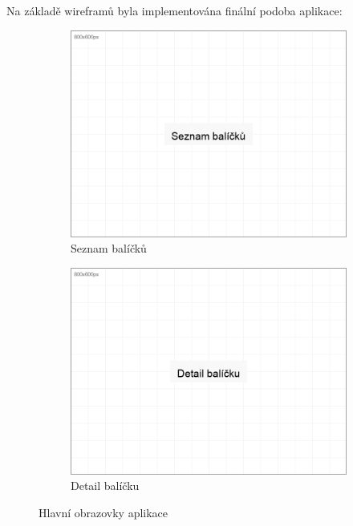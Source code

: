 \documentclass[12pt, a4paper, twoside, openright]{report}
\begin{document}
	Na základě wireframů byla implementována finální podoba aplikace:

	\begin{figure}[h]
		\centering
		\begin{subfigure}[b]{0.48\textwidth}
			\includegraphics[width=\linewidth]{image/screen-deck-list.png}
			\caption{Seznam balíčků}
			\label{fig:screen-decks}
		\end{subfigure}
		\hfill
		\begin{subfigure}[b]{0.48\textwidth}
			\includegraphics[width=\linewidth]{image/screen-deck-detail.png}
			\caption{Detail balíčku}
			\label{fig:screen-detail}
		\end{subfigure}
		\caption{Hlavní obrazovky aplikace}
		\label{fig:screens}
	\end{figure}
\end{document}
